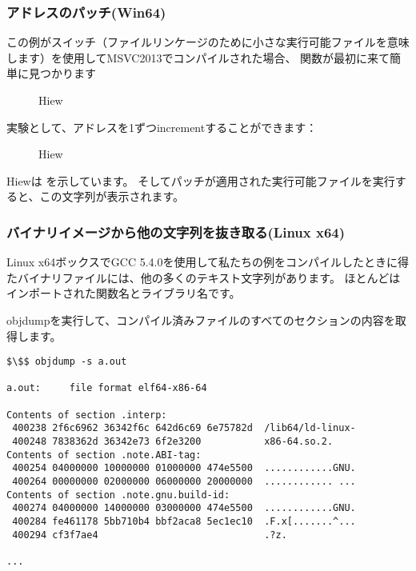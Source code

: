 \subsubsection{アドレスのパッチ(Win64)}

この例がスイッチ（ファイルリンケージのために小さな実行可能ファイルを意味します）を使用してMSVC2013でコンパイルされた場合、 \main 関数が最初に来て簡単に見つかります

\begin{figure}[H]
\centering
{}
\caption{Hiew}
\label{}
\end{figure}

実験として、アドレスを1ずつ\gls{increment}することができます：

\begin{figure}[H]
\centering
{}
\caption{Hiew}
\label{}
\end{figure}

Hiewは を示しています。 そしてパッチが適用された実行可能ファイルを実行すると、この文字列が表示されます。

\subsubsection{バイナリイメージから他の文字列を抜き取る(Linux x64)}

Linux x64ボックスでGCC 5.4.0を使用して私たちの例をコンパイルしたときに得たバイナリファイルには、他の多くのテキスト文字列があります。
ほとんどはインポートされた関数名とライブラリ名です。

objdumpを実行して、コンパイル済みファイルのすべてのセクションの内容を取得します。

\begin{lstlisting}[basicstyle=\ttfamily, mathescape]
$\$$ objdump -s a.out

a.out:     file format elf64-x86-64

Contents of section .interp:
 400238 2f6c6962 36342f6c 642d6c69 6e75782d  /lib64/ld-linux-
 400248 7838362d 36342e73 6f2e3200           x86-64.so.2.
Contents of section .note.ABI-tag:
 400254 04000000 10000000 01000000 474e5500  ............GNU.
 400264 00000000 02000000 06000000 20000000  ............ ...
Contents of section .note.gnu.build-id:
 400274 04000000 14000000 03000000 474e5500  ............GNU.
 400284 fe461178 5bb710b4 bbf2aca8 5ec1ec10  .F.x[.......^...
 400294 cf3f7ae4                             .?z.

...
\end{lstlisting}


